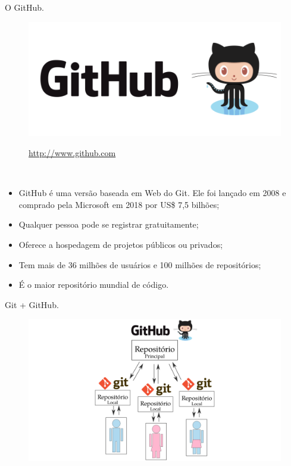 \documentclass[brazil,aspectratio=169]{beamer}
\begin{document}
\begin{frame}{O GitHub.}
\begin{figure}
  \centering
  \includegraphics[scale=0.35]{imagens/github-logo}

  \url{http://www.github.com}
\end{figure}

\begin{block}{\ }
\begin{itemize}
 \item GitHub é uma versão baseada em Web do Git. Ele foi lançado em 2008 e comprado
 pela Microsoft em 2018 por US\$ 7,5 bilhões;
 \item Qualquer pessoa pode se registrar gratuitamente;
 \item Oferece a hospedagem de projetos públicos ou privados;
 \item Tem mais de 36 milhões de usuários e 100 milhões de repositórios;
 \item É o maior repositório mundial de código.
\end{itemize}
\end{block}
\end{frame}

\begin{frame}{Git + GitHub.}
\begin{figure}
\includegraphics[scale=0.35]{imagens/git_e_github}
\end{figure}
\end{frame}
\end{document}
